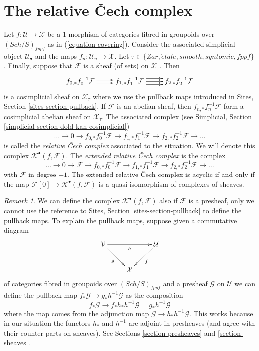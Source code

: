 \documentclass{stacks-project}
\theoremstyle{plain}
\theoremstyle{definition}
\theoremstyle{remark}
\newtheorem{remark}[subsection]{Remark}
\numberwithin{equation}{subsection}
\def\Sch{\mathit{Sch}}
\def\etale{{\acute{e}tale}}
\begin{document}
\section{The relative {\v C}ech complex}
\label{section-sheaf-cech-complex}

\noindent
Let $f : \mathcal{U} \to \mathcal{X}$ be a $1$-morphism of categories
fibred in groupoids over $(\Sch/S)_{fppf}$ as in
(\ref{equation-covering}). Consider the associated simplicial
object $\mathcal{U}_\bullet$ and the maps
$f_n : \mathcal{U}_n \to \mathcal{X}$. Let
$\tau \in \{Zar, \etale, smooth, syntomic, fppf\}$.
Finally, suppose that $\mathcal{F}$ is a sheaf (of sets)
on $\mathcal{X}_\tau$. Then
$$
\xymatrix{
f_{0, *}f_0^{-1}\mathcal{F}
\ar@<0.5ex>[r]
\ar@<-0.5ex>[r]
&
f_{1, *}f_1^{-1}\mathcal{F}
\ar@<1ex>[r]
\ar@<0ex>[r]
\ar@<-1ex>[r]
&
f_{2, *}f_2^{-1}\mathcal{F}
}
$$
is a cosimplicial sheaf on $\mathcal{X}_\tau$ where we use the pullback maps
introduced in
Sites, Section \ref{sites-section-pullback}.
If $\mathcal{F}$ is an abelian sheaf, then $f_{n, *}f_n^{-1}\mathcal{F}$
form a cosimplicial abelian sheaf on $\mathcal{X}_\tau$.
The associated complex (see
Simplicial, Section \ref{simplicial-section-dold-kan-cosimplicial})
$$
\ldots \to 0 \to
f_{0, *}f_0^{-1}\mathcal{F} \to
f_{1, *}f_1^{-1}\mathcal{F} \to
f_{2, *}f_2^{-1}\mathcal{F} \to \ldots
$$
is called the {\it relative {\v C}ech complex} associated to the situation.
We will denote this complex $\mathcal{K}^\bullet(f, \mathcal{F})$.
The {\it extended relative {\v C}ech complex} is the complex
$$
\ldots \to 0 \to
\mathcal{F} \to
f_{0, *}f_0^{-1}\mathcal{F} \to
f_{1, *}f_1^{-1}\mathcal{F} \to
f_{2, *}f_2^{-1}\mathcal{F} \to \ldots
$$
with $\mathcal{F}$ in degree $-1$. The extended relative {\v C}ech complex
is acyclic if and only if the map
$\mathcal{F}[0] \to \mathcal{K}^\bullet(f, \mathcal{F})$
is a quasi-isomorphism of complexes of sheaves.

\begin{remark}
\label{remark-cech-complex-presheaves}
We can define the complex $\mathcal{K}^\bullet(f, \mathcal{F})$
also if $\mathcal{F}$ is a presheaf, only we cannot use the reference to
Sites, Section \ref{sites-section-pullback}
to define the pullback maps. To explain the pullback maps, suppose
given a commutative diagram
$$
\xymatrix{
\mathcal{V} \ar[rd]_g \ar[rr]_h & &  \mathcal{U} \ar[ld]^f \\
& \mathcal{X}
}
$$
of categories fibred in groupoids over $(\Sch/S)_{fppf}$
and a presheaf $\mathcal{G}$ on $\mathcal{U}$
we can define the pullback map $f_*\mathcal{G} \to g_*h^{-1}\mathcal{G}$
as the composition
$$
f_*\mathcal{G} \longrightarrow
f_*h_*h^{-1}\mathcal{G} = g_*h^{-1}\mathcal{G}
$$
where the map comes from the adjunction map
$\mathcal{G} \to h_*h^{-1}\mathcal{G}$. This works because in our situation
the functors $h_*$ and $h^{-1}$ are adjoint in presheaves (and agree with
their counter parts on sheaves). See
Sections \ref{section-presheaves} and \ref{section-sheaves}.
\end{remark}
\end{document}
